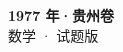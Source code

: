 \documentclass[zihao=-4, a4paper]{ctexart}
\begin{document}
\begin{center}
  {\Large\bfseries 1977 年·贵州卷}\\[4pt]
  {\large 数学 · 试题版}
\end{center}
\medskip
{}

\end{document}
